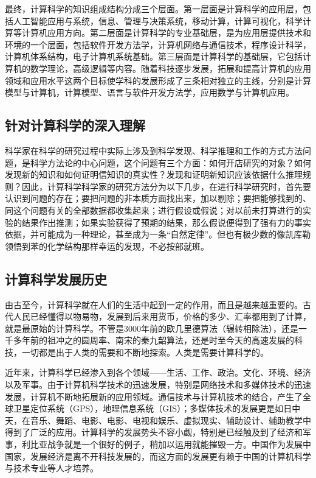 \documentclass{article}
\begin{document}
最终，计算科学的知识组成结构分成三个层面。第一层面是计算科学的应用层，包括人工智能应用与系统，信息、管理与决策系统，移动计算，计算可视化，科学计算等计算机应用方向。第二层面是计算科学的专业基础层，是为应用层提供技术和环境的一个层面，包括软件开发方法学，计算机网络与通信技术，程序设计科学，计算机体系结构，电子计算机系统基础。第三层面是计算科学的基础层，它包括计算机的数学理论，高级逻辑等内容。随着科技逐步发展，拓展和提高计算机的应用领域和应用水平这两个目标使学科的发展形成了三条相对独立的主线，分别是计算模型与计算机，计算模型、语言与软件开发方法学，应用数学与计算机应用。\par

\subsection{针对计算科学的深入理解}
科学家在科学的研究过程中实际上涉及到科学发现、科学推理和工作的方式方法问题，是科学方法论的中心问题，这个问题有三个方面：如何开店研究的对象？如何发现新的知识和如何证明信知识的真实性？发现和证明新知识应该依据什么推理规则？因此，计算科学科学家的研究方法分为以下几步，在进行科学研究时，首先要认识到问题的存在；要把问题的非本质方面找出来，加以剔除；要把能够找到的、同这个问题有关的全部数据都收集起来；进行假设或假说；对以前未打算进行的实验的结果作出推测；如果实验获得了预期的结果，那么假说便得到了强有力的事实依据，并可能成为一种理论，甚至成为一条“自然定律”。但也有极少数的像凯库勒领悟到苯的化学结构那样幸运的发现，不必按部就班。\par

\subsection{计算科学发展历史}
由古至今，计算科学就在人们的生活中起到一定的作用，而且是越来越重要的。古代人民已经懂得以物易物，发展到后来用货币，价格的多少、汇率都用到了计算，就是最原始的计算科学。不管是3000年前的欧几里德算法（辗转相除法），还是一千多年前的祖冲之的圆周率、南宋的秦九韶算法，还是时至今天的高速发展的科技，一切都是出于人类的需要和不断地探索。人类是需要计算科学的。\par

近年来，计算科学已经渗入到各个领域——生活、工作、政治。文化、环境、经济以及军事。由于计算机科学技术的迅速发展，特别是网络技术和多媒体技术的迅速发展，计算机不断地拓展新的应用领域。通信技术与计算机技术的结合，产生了全球卫星定位系统（GPS），地理信息系统（GIS）；多媒体技术的发展更是如日中天，在音乐、舞蹈、电影、电影、电视和娱乐、虚拟现实、辅助设计、辅助教学中得到了广泛的应用。计算科学的发展势头不容小觑，特别是已经触及到了经济和军事，利比亚战争就是一个很好的例子，稍加以运用就能摧毁一方。中国作为发展中国家，发展经济是离不开科技发展的，而这方面的发展更有赖于中国的计算机科学与技术专业等人才培养。\par
\end{document}
